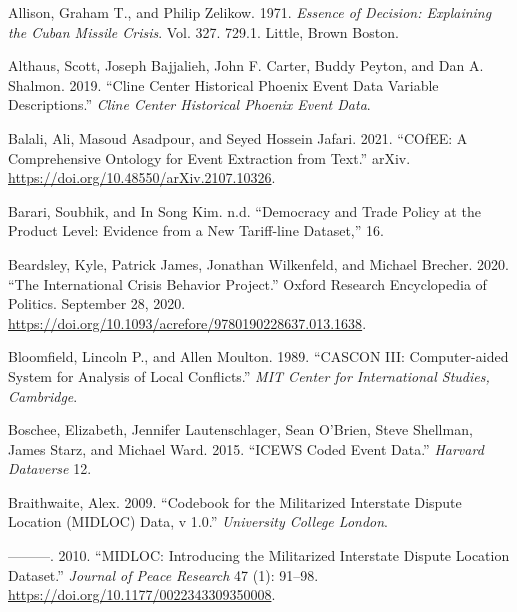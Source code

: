 \documentclass{article}
\newlength{\cslhangindent}
\newlength{\cslentryspacingunit} %
\newenvironment{CSLReferences}[2] %
 {%
  \setlength{\parindent}{0pt}
  \ifodd #1
  \let\oldpar\par
  \def\par{\hangindent=\cslhangindent\oldpar}
  \fi
  \setlength{\parskip}{#2\cslentryspacingunit}
 }%
 {}
\begin{document}
\hypertarget{refs}{}
\begin{CSLReferences}{1}{0}
\leavevmode{}%
Allison, Graham T., and Philip Zelikow. 1971. \emph{Essence of Decision:
{Explaining} the {Cuban} Missile Crisis}. Vol. 327. 729.1. {Little,
Brown Boston}.

\leavevmode{}%
Althaus, Scott, Joseph Bajjalieh, John F. Carter, Buddy Peyton, and Dan
A. Shalmon. 2019. {``Cline {Center Historical Phoenix Event Data
Variable Descriptions}.''} \emph{Cline Center Historical Phoenix Event
Data}.

\leavevmode{}%
Balali, Ali, Masoud Asadpour, and Seyed Hossein Jafari. 2021.
{``{COfEE}: {A Comprehensive Ontology} for {Event Extraction} from
Text.''} {arXiv}. \url{https://doi.org/10.48550/arXiv.2107.10326}.

\leavevmode{}%
Barari, Soubhik, and In Song Kim. n.d. {``Democracy and {Trade Policy}
at the {Product Level}: {Evidence} from a {New Tariff-line Dataset},''}
16.

\leavevmode{}%
Beardsley, Kyle, Patrick James, Jonathan Wilkenfeld, and Michael
Brecher. 2020. {``The {International Crisis Behavior Project}.''}
{Oxford Research Encyclopedia of Politics}. September 28, 2020.
\url{https://doi.org/10.1093/acrefore/9780190228637.013.1638}.

\leavevmode{}%
Bloomfield, Lincoln P., and Allen Moulton. 1989. {``{CASCON III}:
{Computer-aided} System for Analysis of Local Conflicts.''} \emph{MIT
Center for International Studies, Cambridge}.

\leavevmode{}%
Boschee, Elizabeth, Jennifer Lautenschlager, Sean O'Brien, Steve
Shellman, James Starz, and Michael Ward. 2015. {``{ICEWS} Coded Event
Data.''} \emph{Harvard Dataverse} 12.

\leavevmode{}%
Braithwaite, Alex. 2009. {``Codebook for the {Militarized Interstate
Dispute Location} ({MIDLOC}) {Data}, v 1.0.''} \emph{University College
London}.

\leavevmode{}%
---------. 2010. {``{MIDLOC}: {Introducing} the {Militarized Interstate
Dispute Location} Dataset.''} \emph{Journal of Peace Research} 47 (1):
91--98. \url{https://doi.org/10.1177/0022343309350008}.


\end{CSLReferences}
\end{document}
